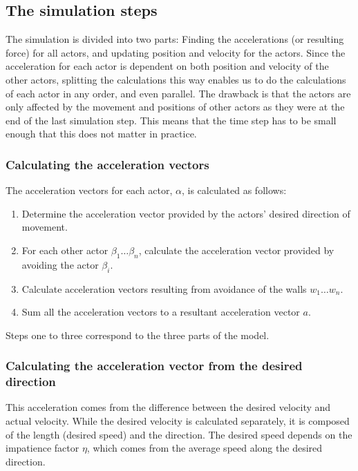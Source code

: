 
\subsection{The simulation steps}
The simulation is divided into two parts: Finding the accelerations (or 
resulting force) for all actors, and updating position and velocity for the 
actors.  Since the acceleration for each actor is dependent on both position 
and velocity of the other actors, splitting the calculations this way enables 
us to do the calculations of each actor in any order, and even parallel. The 
drawback is that the actors are only affected by the movement and positions of 
other actors as they were at the end of the last simulation step. This means 
that the time step has to be small enough that this does not matter in 
practice.

\subsubsection{Calculating the acceleration vectors}
The acceleration vectors for each actor, $\alpha$, is calculated as follows:

\begin{enumerate}
    \item Determine the acceleration vector provided by the actors' desired 
        direction of movement.
    \item For each other actor $\beta_1\dots\beta_n$, calculate the 
        acceleration vector provided by avoiding the actor $\beta_i$.
    \item Calculate acceleration vectors resulting from avoidance of the walls 
        $w_1\dots w_n$.
    \item Sum all the acceleration vectors to a resultant acceleration vector 
        $a$.
\end{enumerate}

Steps one to three correspond to the three parts of the model.
\subsubsection{Calculating the acceleration vector from the desired direction}
This acceleration comes from the difference between the desired velocity and 
actual velocity. While the desired velocity is calculated separately, it is 
composed of the length (desired speed) and the direction. The desired speed 
depends on the impatience factor $ \eta $, which comes from the average speed
 along the desired direction.

